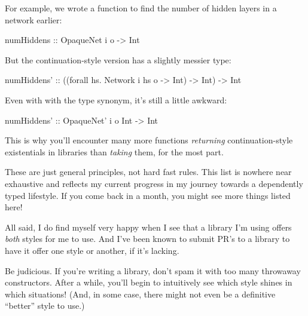 \documentclass[]{article}
\newenvironment{Shaded}{}{}
\newcommand{\DataTypeTok}[1]{\textcolor[rgb]{0.56,0.13,0.00}{#1}}
\newcommand{\FunctionTok}[1]{\textcolor[rgb]{0.02,0.16,0.49}{#1}}
\newcommand{\NormalTok}[1]{#1}
\newcommand{\OtherTok}[1]{\textcolor[rgb]{0.00,0.44,0.13}{#1}}
\begin{document}
\begin{itemize}
  For example, we wrote a function to find the number of hidden layers in a
  network earlier:

\begin{Shaded}
\begin{Highlighting}[]
\OtherTok{numHiddens ::} \DataTypeTok{OpaqueNet}\NormalTok{ i o }\OtherTok{->} \DataTypeTok{Int}
\end{Highlighting}
\end{Shaded}

  But the continuation-style version has a slightly messier type:

\begin{Shaded}
\begin{Highlighting}[]
\OtherTok{numHiddens' ::}\NormalTok{ ((forall hs}\FunctionTok{.} \DataTypeTok{Network}\NormalTok{ i hs o }\OtherTok{->} \DataTypeTok{Int}\NormalTok{) }\OtherTok{->} \DataTypeTok{Int}\NormalTok{)}
            \OtherTok{->} \DataTypeTok{Int}
\end{Highlighting}
\end{Shaded}

  Even with with the type synonym, it's still a little awkward:

\begin{Shaded}
\begin{Highlighting}[]
\OtherTok{numHiddens' ::} \DataTypeTok{OpaqueNet'}\NormalTok{ i o }\DataTypeTok{Int} \OtherTok{->} \DataTypeTok{Int}
\end{Highlighting}
\end{Shaded}

  This is why you'll encounter many more functions \emph{returning}
  continuation-style existentials in libraries than \emph{taking} them, for the
  most part.
\end{itemize}

These are just general principles, not hard fast rules. This list is nowhere
near exhaustive and reflects my current progress in my journey towards a
dependently typed lifestyle. If you come back in a month, you might see more
things listed here!

All said, I do find myself very happy when I see that a library I'm using offers
\emph{both} styles for me to use. And I've been known to submit PR's to a
library to have it offer one style or another, if it's lacking.

Be judicious. If you're writing a library, don't spam it with too many throwaway
constructors. After a while, you'll begin to intuitively see which style shines
in which situations! (And, in some case, there might not even be a definitive
``better'' style to use.)
\end{document}
